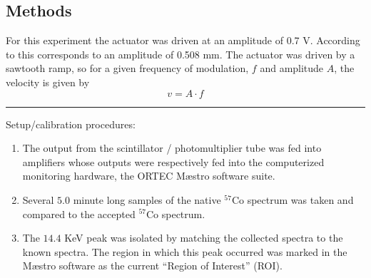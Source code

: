 \documentclass[paper=a4, fontsize=11pt, abstract=on]{scrartcl} %
\numberwithin{equation}{section}
\numberwithin{figure}{section}
\numberwithin{table}{section}
\begin{document}
\subsection{Methods}
\label{sec:stmeth}

For this experiment the actuator was driven at an amplitude of 0.7
V. According to \cite{writeup} this corresponds to an amplitude of
0.508 mm. The actuator was driven by a sawtooth ramp, so for a given
frequency of modulation, $f$ and amplitude $A$, the velocity is given by
\begin{equation}
  \label{eq:vel}
  v = A\cdot f
\end{equation}

\hrule
Setup/calibration procedures:
\begin{enumerate}
\item The output from the scintillator / photomultiplier tube was fed into amplifiers whose outputs were respectively fed into the computerized monitoring hardware, the ORTEC M\ae{}stro software suite.
\item Several $5.0$ minute long samples of the native $^{57}$Co spectrum was taken and compared to the accepted $^{57}$Co spectrum.
\item The $14.4$ KeV peak was isolated by matching the collected spectra to the known spectra. The region in which this peak occurred was marked in the M\ae{}stro software as the current ``Region of Interest'' (ROI).
\end{enumerate}

\vspace{1.2em}
\end{document}
